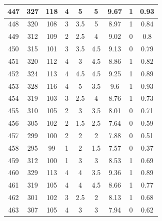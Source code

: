 \documentclass[11pt]{article}
\begin{document}
\begin{appendix}
\begin{longtable}[H]{|c|c|c|c|c|c|c|c|c|}
	447        & 327       & 118         & 4                 & 5   & 5   & 9.67 & 1        & 0.93            \\ \hline
	448        & 320       & 108         & 3                 & 3.5 & 5   & 8.97 & 1        & 0.84            \\ \hline
	449        & 312       & 109         & 2                 & 2.5 & 4   & 9.02 & 0        & 0.8             \\ \hline
	450        & 315       & 101         & 3                 & 3.5 & 4.5 & 9.13 & 0        & 0.79            \\ \hline
	451        & 320       & 112         & 4                 & 3   & 4.5 & 8.86 & 1        & 0.82            \\ \hline
	452        & 324       & 113         & 4                 & 4.5 & 4.5 & 9.25 & 1        & 0.89            \\ \hline
	453        & 328       & 116         & 4                 & 5   & 3.5 & 9.6  & 1        & 0.93            \\ \hline
	454        & 319       & 103         & 3                 & 2.5 & 4   & 8.76 & 1        & 0.73            \\ \hline
	455        & 310       & 105         & 2                 & 3   & 3.5 & 8.01 & 0        & 0.71            \\ \hline
	456        & 305       & 102         & 2                 & 1.5 & 2.5 & 7.64 & 0        & 0.59            \\ \hline
	457        & 299       & 100         & 2                 & 2   & 2   & 7.88 & 0        & 0.51            \\ \hline
	458        & 295       & 99          & 1                 & 2   & 1.5 & 7.57 & 0        & 0.37            \\ \hline
	459        & 312       & 100         & 1                 & 3   & 3   & 8.53 & 1        & 0.69            \\ \hline
	460        & 329       & 113         & 4                 & 4   & 3.5 & 9.36 & 1        & 0.89            \\ \hline
	461        & 319       & 105         & 4                 & 4   & 4.5 & 8.66 & 1        & 0.77            \\ \hline
	462        & 301       & 102         & 3                 & 2.5 & 2   & 8.13 & 1        & 0.68            \\ \hline
	463        & 307       & 105         & 4                 & 3   & 3   & 7.94 & 0        & 0.62            \\ \hline

\end{longtable}
\end{appendix}
\end{document}
